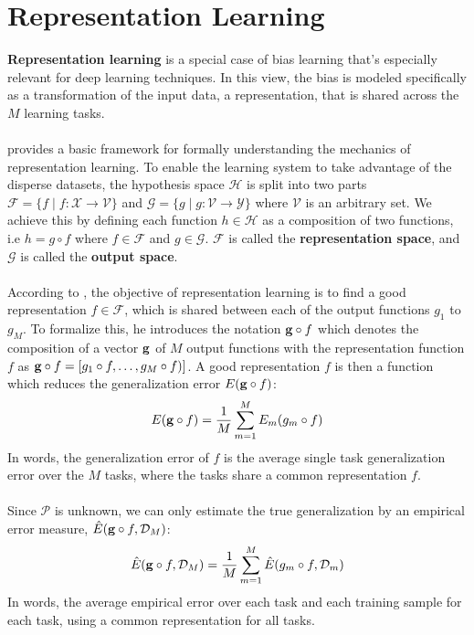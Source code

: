 \section{Representation Learning}
\label{representation_learning}
\textbf{Representation learning} is a special case of bias learning that's especially relevant for deep learning techniques. In this view, the bias is modeled specifically as a transformation of the input data, a representation, that is shared across the $M$ learning tasks.
\\\\
\citet{baxter1995} provides a basic framework for formally understanding the mechanics of representation learning. To enable the learning system to take advantage of the disperse datasets, the hypothesis space $\mathcal{H}$ is split into two parts $\mathcal{F} = \{f \mid f: \mathcal{X} \to \mathcal{V}\}$ and $\mathcal{G} = \{g \mid g: \mathcal{V} \to \mathcal{Y} \}$ where $\mathcal{V}$ is an arbitrary set. We achieve this by defining each function $h \in \mathcal{H}$ as a composition of two functions, i.e $h = g \circ f$ where $f \in \mathcal{F}$ and $g \in \mathcal{G}$. $\mathcal{F}$ is called the \textbf{representation space}, and $\mathcal{G}$ is called the \textbf{output space}.
\\\\
According to \citet{baxter2000}, the objective of representation learning is to find a good representation $f \in \mathcal{F}$, which is shared between each of the output functions $g_1$ to $g_M$. To formalize this, he introduces the notation $\mathbf{g} \circ f$ which denotes the composition of a vector $\mathbf{g}$ of $M$ output functions with the representation function $f$ as $\mathbf{g} \circ f = [g_1 \circ f, \dots, g_M \circ f)]$. A good representation $f$ is then a function which reduces the generalization error $E(\mathbf{g} \circ f)$:
$$
E(\mathbf{g} \circ f) = \frac{1}{M}\sum\limits_{m = 1}^M E_m(g_m \circ f)
$$
In words, the generalization error of $f$ is the average single task generalization error over the $M$ tasks, where the tasks share a common representation $f$.
\\\\
Since $\mathcal{P}$ is unknown, we can only estimate the true generalization by an empirical error measure, $\hat{E}(\mathbf{g} \circ f,\mathcal{D}_M)$:
$$
\hat{E}(\mathbf{g} \circ f,\mathcal{D}_M) = \frac{1}{M} \sum\limits_{m = 1}^M \hat{E}(g_m \circ f, \mathcal{D}_m)
$$
In words, the average empirical error over each task and each training sample for each task, using a common representation for all tasks.
